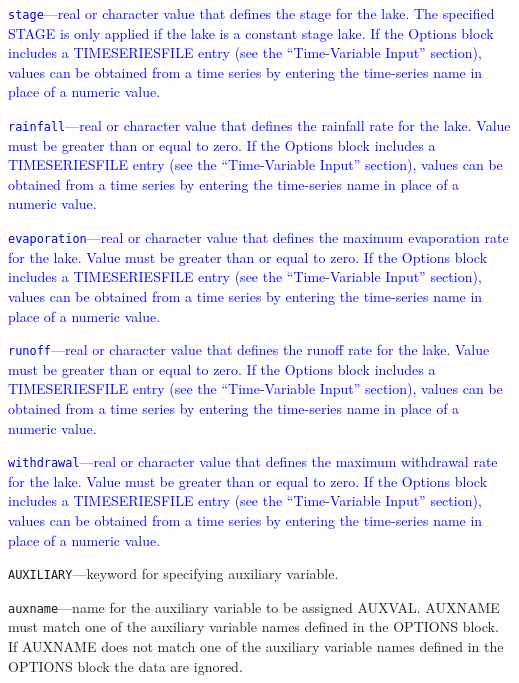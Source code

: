 \begin{description}
\item \textcolor{blue}{\texttt{stage}---real or character value that defines the stage for the lake. The specified STAGE is only applied if the lake is a constant stage lake. If the Options block includes a TIMESERIESFILE entry (see the ``Time-Variable Input'' section), values can be obtained from a time series by entering the time-series name in place of a numeric value.}

\item \textcolor{blue}{\texttt{rainfall}---real or character value that defines the rainfall rate for the lake. Value must be greater than or equal to zero. If the Options block includes a TIMESERIESFILE entry (see the ``Time-Variable Input'' section), values can be obtained from a time series by entering the time-series name in place of a numeric value.}

\item \textcolor{blue}{\texttt{evaporation}---real or character value that defines the maximum evaporation rate for the lake. Value must be greater than or equal to zero. If the Options block includes a TIMESERIESFILE entry (see the ``Time-Variable Input'' section), values can be obtained from a time series by entering the time-series name in place of a numeric value.}

\item \textcolor{blue}{\texttt{runoff}---real or character value that defines the runoff rate for the lake. Value must be greater than or equal to zero. If the Options block includes a TIMESERIESFILE entry (see the ``Time-Variable Input'' section), values can be obtained from a time series by entering the time-series name in place of a numeric value.}

\item \textcolor{blue}{\texttt{withdrawal}---real or character value that defines the maximum withdrawal rate for the lake. Value must be greater than or equal to zero. If the Options block includes a TIMESERIESFILE entry (see the ``Time-Variable Input'' section), values can be obtained from a time series by entering the time-series name in place of a numeric value.}

\item \texttt{AUXILIARY}---keyword for specifying auxiliary variable.

\item \texttt{auxname}---name for the auxiliary variable to be assigned AUXVAL.  AUXNAME must match one of the auxiliary variable names defined in the OPTIONS block. If AUXNAME does not match one of the auxiliary variable names defined in the OPTIONS block the data are ignored.


\end{description}
